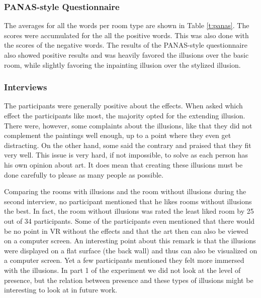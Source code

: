 \documentclass[a4paper]{article}
\begin{document}
\subsubsection{PANAS-style Questionnaire}
The averages for all the words per room type are shown in Table \ref{t:panas}. The scores were accumulated for the all the positive words. This was also done with the scores of the negative words. The results of the PANAS-style questionnaire also showed positive results and was heavily favored the illusions over the basic room, while slightly favoring the inpainting illusion over the stylized illusion. 

\subsubsection{Interviews}
The participants were generally positive about the effects. When asked which effect the participants like most, the majority opted for the extending illusion. There were, however, some complaints about the illusions, like that they did not complement the paintings well enough, up to a point where they even get distracting. On the other hand, some said the contrary and praised that they fit very well. This issue is very hard, if not impossible, to solve as each person has his own opinion about art. It does mean that creating these illusions must be done carefully to please as many people as possible.

Comparing the rooms with illusions and the room without illusions during the second interview, no participant mentioned that he likes rooms without illusions the best. In fact, the room without illusions was rated the least liked room by 25 out of 34 participants. Some of the participants even mentioned that there would be no point in VR without the effects and that the art then can also be viewed on a computer screen. An interesting point about this remark is that the illusions were displayed on a flat surface (the back wall) and thus can also be visualized on a computer screen. Yet a few participants mentioned they felt more immersed with the illusions. In part 1 of the experiment we did  not look at the level of presence, but the relation between presence and these types of illusions might be interesting to look at in future work.
\end{document}
